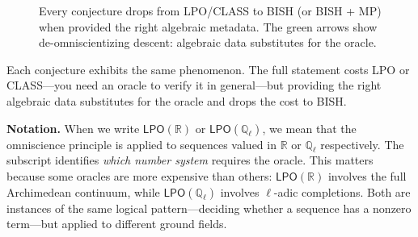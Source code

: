 \documentclass[11pt,twoside,openany]{report}
\theoremstyle{remark}
\newcommand{\BISH}{\textsf{BISH}}
\newcommand{\LPO}{\textsf{LPO}}
\newcommand{\CLASS}{\textsf{CLASS}}
\newcommand{\MP}{\textsf{MP}}
\begin{document}
\begin{figure}[htbp]
\caption{Every conjecture drops from \LPO/\CLASS{} to \BISH{} (or \BISH{} + \MP) when provided the right algebraic metadata. The green arrows show de-omniscientizing descent: algebraic data substitutes for the oracle.}
\label{fig:five-conjectures}
\end{figure}

Each conjecture exhibits the same phenomenon. The full statement costs \LPO{} or \CLASS{}---you need an oracle to verify it in general---but providing the right algebraic data substitutes for the oracle and drops the cost to \BISH.

\smallskip
\noindent\textbf{Notation.} When we write $\LPO(\mathbb{R})$ or $\LPO(\mathbb{Q}_\ell)$, we mean that the omniscience principle is applied to sequences valued in $\mathbb{R}$ or $\mathbb{Q}_\ell$ respectively. The subscript identifies \emph{which number system} requires the oracle. This matters because some oracles are more expensive than others: $\LPO(\mathbb{R})$ involves the full Archimedean continuum, while $\LPO(\mathbb{Q}_\ell)$ involves $\ell$-adic completions. Both are instances of the same logical pattern---deciding whether a sequence has a nonzero term---but applied to different ground fields.
\smallskip
\end{document}
